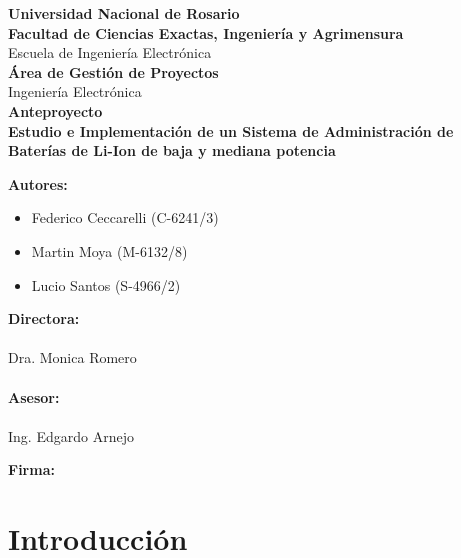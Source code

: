 \documentclass[10pt,a4paper]{article}
\begin{document}
\begin{titlepage}
\begin{center}
			\large{ \textbf{Universidad Nacional de Rosario}} \\[5mm]
			\textbf{Facultad de Ciencias Exactas, Ingeniería y Agrimensura} \\[5mm]
			Escuela de Ingeniería Electrónica \\[20mm]
			\Large {\textbf{Área de Gestión de Proyectos}}\\[1.5mm]
			\small {Ingeniería Electrónica} \\[20mm]
			\Large {\textbf{Anteproyecto}} \\[5mm]
			\Large{ \textbf{Estudio e Implementación de un Sistema de Administración de Baterías de Li-Ion de baja y mediana potencia}} \\[15mm]
			
		\end{center}
		\begin{minipage}[t]{0.5\textwidth}
			{\large\textbf{Autores:}}
			\begin{itemize}
				\item Federico Ceccarelli (C-6241/3)
				\item Martin Moya (M-6132/8)
				\item Lucio Santos (S-4966/2)
			\end{itemize}
			\vspace{10pt}
			{\large\textbf{Directora:}}\\
			\\
			Dra. Monica Romero\\
			\\
			{\large\textbf{Asesor:}}\\
			\\
			Ing. Edgardo Arnejo
			
			
		\end{minipage}
		\begin{minipage}[t]{0.5\textwidth}
			\Large\textbf{Firma:}
		\end{minipage}
		
		
	\end{titlepage}
	
	\tableofcontents
	
	\clearpage
	
	\section{Introducción}
	
\end{document}
